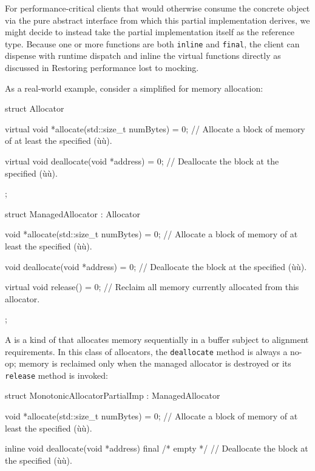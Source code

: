 {For performance-critical clients that would otherwise consume the
concrete object via the pure abstract interface from which this partial
implementation derives, we might decide to instead take the partial
implementation itself as the reference type. Because one or more
functions are both \lstinline!inline! and \lstinline!final!, the client can
dispense with runtime dispatch and inline the virtual functions directly
as discussed in {Restoring performance lost to mocking}.

As a real-world example, consider a simplified  for memory allocation:

\begin{emcppslisting}
struct Allocator
{
    virtual void *allocate(std::size_t numBytes) = 0;
        // Allocate a block of memory of at least the specified (ù{}ù).

    virtual void deallocate(void *address) = 0;
        // Deallocate the block at the specified (ù{}ù).
};

struct ManagedAllocator : Allocator
{
    void *allocate(std::size_t numBytes) = 0;
        // Allocate a block of memory of at least the specified (ù{}ù).

    void deallocate(void *address) = 0;
        // Deallocate the block at the specified (ù{}ù).

    virtual void release() = 0;
        // Reclaim all memory currently allocated from this allocator.
};
\end{emcppslisting}
    

\noindent A  is a kind of 
that allocates memory sequentially in a buffer subject to alignment
requirements. In this class of allocators, the \lstinline!deallocate!
method is always a no-op; memory is reclaimed only when the managed
allocator is destroyed or its \lstinline!release! method is invoked:

\begin{emcppslisting}
struct MonotonicAllocatorPartialImp : ManagedAllocator
{
    void *allocate(std::size_t numBytes) = 0;
        // Allocate a block of memory of at least the specified (ù{}ù).

    inline void deallocate(void *address) final { /* empty */ }
        // Deallocate the block at the specified (ù{}ù).

}
\end{emcppslisting}}
